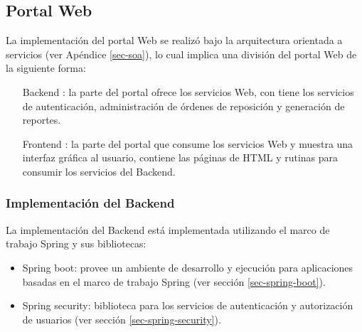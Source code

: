 \subsection{Portal Web}
La implementación del portal Web se realizó bajo la arquitectura orientada a servicios (ver Apéndice \ref{sec-soa}), lo cual implica una división del portal Web de la siguiente forma:
\begin{itemize}
	\item [Backend]: la parte del portal ofrece los servicios Web, con tiene los servicios de autenticación, administración de órdenes de reposición y generación de reportes.
	\item [Frontend]: la parte del portal que consume los servicios Web y muestra una interfaz gráfica al usuario, contiene las páginas de HTML y rutinas para consumir los servicios del Backend.
\end{itemize}

\subsubsection{Implementación del Backend}
La implementación del Backend está implementada utilizando el marco de trabajo Spring y sus bibliotecas:
\begin{itemize}
 	\item Spring boot: provee un ambiente de desarrollo y ejecución para aplicaciones basadas en el marco de trabajo Spring (ver sección \ref{sec-spring-boot}). 
 	\item Spring security: biblioteca para los servicios de autenticación y autorización de usuarios (ver sección \ref{sec-spring-security}).
\end{itemize}

